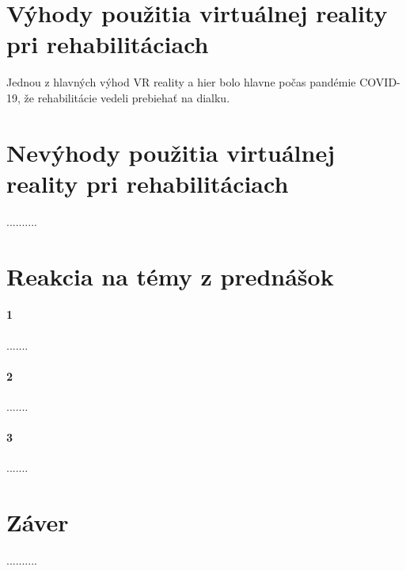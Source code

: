 \documentclass[10pt,twoside,slovak,a4paper]{article}
\begin{document}
\section{Výhody použitia virtuálnej reality pri rehabilitáciach} 
Jednou z hlavných výhod VR reality a hier bolo hlavne počas pandémie COVID-19, že rehabilitácie vedeli prebiehať na dialku.



\section{Nevýhody použitia virtuálnej reality pri rehabilitáciach}
..........\cite{7523762}


\section{Reakcia na témy z prednášok}
\paragraph{1}

.......
\paragraph{2}


.......
\paragraph{3}

.......



\section{Záver} 
..........







\end{document}
